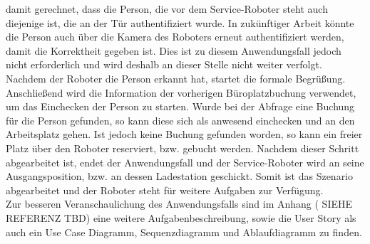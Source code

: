     damit gerechnet, dass die Person, die vor dem Service-Roboter steht auch diejenige ist, die an der Tür authentifiziert 
    wurde. In zukünftiger Arbeit könnte die Person auch über die Kamera des Roboters erneut authentifiziert werden, damit die 
    Korrektheit gegeben ist. Dies ist zu diesem Anwendungsfall jedoch nicht erforderlich und wird deshalb an dieser Stelle 
    nicht weiter verfolgt. 
    \\
    Nachdem der Roboter die Person erkannt hat, startet die formale Begrüßung. Anschließend wird die Information der 
    vorherigen Büroplatzbuchung verwendet, um das Einchecken der Person zu starten. Wurde bei der Abfrage eine Buchung für 
    die Person gefunden, so kann diese sich als anwesend einchecken und an den Arbeitsplatz gehen. Ist jedoch keine 
    Buchung gefunden worden, so kann ein freier Platz über den Roboter reserviert, bzw. gebucht werden. Nachdem dieser 
    Schritt abgearbeitet ist, endet der Anwendungsfall und der Service-Roboter wird an seine Ausgangsposition, bzw. an dessen 
    Ladestation geschickt. Somit ist das Szenario abgearbeitet und der Roboter steht für weitere Aufgaben zur Verfügung. 
    \\
    \linebreak
    Zur besseren Veranschaulichung des Anwendungsfalls sind im Anhang (%
    SIEHE REFERENZ TBD) eine weitere Aufgabenbeschreibung, sowie die User Story als auch ein Use Case Diagramm, 
    Sequenzdiagramm und Ablaufdiagramm zu finden.

